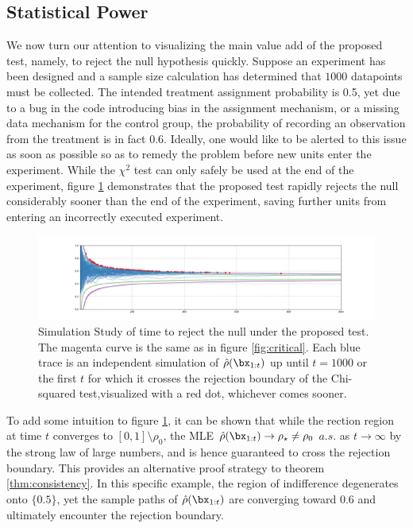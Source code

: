 \documentclass[11pt]{article}
\begin{document}
  \subsection{Statistical Power}
  We now turn our attention to visualizing the main value add of the proposed test, namely, to reject the null hypothesis quickly.
Suppose an experiment has been designed and a sample size calculation has determined that $1000$ datapoints must be collected.
The intended treatment assignment probability is 0.5, yet due to a bug in the code introducing bias in the assignment mechanism, or a missing data mechanism for the control group, the probability of recording an observation from the treatment is in fact 0.6.
Ideally, one would like to be alerted to this issue as soon as possible so as to remedy the problem before new units enter the experiment.
While the $\chi^2$ test can only safely be used at the end of the experiment,
  figure \ref{fig:ssrm_reject} demonstrates that the proposed test rapidly rejects the null considerably sooner than the end of the experiment, saving further units from entering an incorrectly executed experiment.
      \begin{figure}[H]
  \centering
  \includegraphics[scale=0.35]{images/ssrm_reject.png}
  \caption{Simulation Study of time to reject the null under the proposed test.
The magenta curve is the same as in figure \ref{fig:critical}.
Each blue trace is an independent simulation of $\hat{\rho}(\bx_{1:t})$ up until $t=1000$ or the first $t$ for which it crosses the rejection boundary of the Chi-squared test,visualized with a red dot, whichever comes sooner.
}
    \label{fig:ssrm_reject}
  \end{figure}
  \noindent To add some intuition to figure \ref{fig:ssrm_reject}, it can be shown that while the rection region at time $t$ converges to $[0,1]\setminus \rho_0$, the MLE $\hat{\rho}(\bx_{1:t}) \rightarrow \rho_\star \neq \rho_0$ $a.s.$ as $t\rightarrow \infty$ by the strong law of large numbers, and is hence guaranteed to cross the rejection boundary.
  This provides an alternative proof strategy to theorem \ref{thm:consistency}.
In this specific example, the region of indifference degenerates onto $\lbrace 0.5 \rbrace$, yet the sample paths of $\hat{\rho}(\bx_{1:t})$ are converging toward 0.6 and ultimately encounter the rejection boundary.
\end{document}
